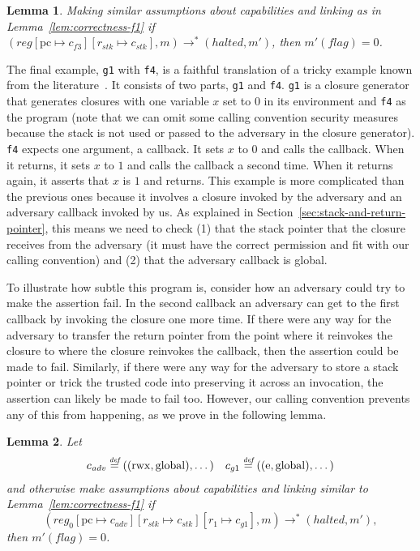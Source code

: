 \documentclass[compsoc,conference,letterpaper,fleqn]{IEEEtran}
\newtheorem{lemma}{Lemma}
\newcommand{\update}[2]{[#1 \mapsto #2]}
\newcommand{\defeq}{\stackrel{\textit{\tiny{def}}}{=}}
\newcommand{\var}[1]{\mathit{#1}}
\newcommand{\pcreg}{\mathrm{pc}}
\newcommand{\reg}{\var{reg}}
\newcommand{\adv}{\var{adv}}
\newcommand{\stk}{\var{stk}}
\newcommand{\flag}{\var{flag}}
\newcommand{\halted}{\mathit{halted}}
\newcommand{\plainperm}[1]{\mathrm{#1}}
\newcommand{\entry}{\plainperm{e}}
\newcommand{\rwx}{\plainperm{rwx}}
\newcommand{\glob}{\plainperm{global}}
\newcommand{\step}[1][]{\rightarrow_{#1}}
\begin{document}
\begin{lemma}
  \label{lem:correctness-f3}
  Making similar assumptions about capabilities and linking as in
  Lemma~\ref{lem:correctness-f1}
  if $(\reg\update{\pcreg}{c_{f3}}\update{r_\stk}{c_\stk},m) \step^*
  (\halted,m')$, then $m'(\flag) = 0$.
\end{lemma}

The final example, \texttt{\footnotesize{g1}} with \texttt{\footnotesize{f4}},
is a faithful translation of a tricky example known from the
literature~\citep{pitts_operational_1998,Dreyer:jfp12}. It consists of two
parts, \texttt{\footnotesize{g1}} and \texttt{\footnotesize{f4}}.
\texttt{\footnotesize{g1}} is a closure generator that generates closures with
one variable $x$ set to $0$ in its environment and \texttt{\footnotesize{f4}} as
the program (note that we can omit some calling convention security measures
because the stack is not used or passed to the adversary in the closure
generator). \texttt{\footnotesize{f4}} expects one argument, a callback. It sets
$x$ to $0$ and calls the callback. When it returns, it sets $x$ to $1$ and calls
the callback a second time. When it returns again, it asserts that $x$ is $1$
and returns. This example is more complicated than the previous ones because it
involves a closure invoked by the adversary and an adversary callback invoked by
us. As explained in Section~\ref{sec:stack-and-return-pointer}, this means we
need to check (1) that the stack pointer that the closure receives from the
adversary (it must have the correct permission and fit with our calling
convention) and (2) that the adversary callback is global.

To illustrate how subtle this program is, consider how an adversary could try to
make the assertion fail. In the second callback an adversary can get to the
first callback by invoking the closure one more time. If there were any way for
the adversary to transfer the return pointer from the point where it reinvokes
the closure to where the closure reinvokes the callback, then the assertion
could be made to fail. Similarly, if there were any way for the adversary to
store a stack pointer or trick the trusted code into preserving it across an
invocation, the assertion can likely be made to fail too. However, our calling
convention prevents any of this from happening, as we prove in the following
lemma.

\begin{lemma}
  \label{lem:correctness-g1}
  Let
\[
    \begin{array}{r@{}lr@{}l}
    c_{\var{adv}} & \;\defeq ((\rwx,\glob),\dots) & c_{g1} & \;\defeq ((\entry,\glob),\dots)
    \end{array}
\]
  and otherwise make assumptions about capabilities and linking similar to Lemma~\ref{lem:correctness-f1} 
  if
  \[
  (\reg_0\update{\pcreg}{c_\adv}\update{r_\stk}{c_\stk}\update{r_1}{c_{g1}},m) \step^* (\halted,m'),
  \]
  then $m'(\flag) = 0$.
\end{lemma}
\end{document}
